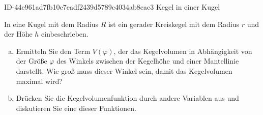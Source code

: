 \begin{exercise}
      {ID-44e961ad7fb10c7eadf2439d5789c4034ab8cac3}
      {Kegel in einer Kugel}
  \ifproblem\problem\par
    \ifthenelse{\isundefined{\linecalc}}{\newlength{\linecalc}}{\relax}%
    \setlength{\linecalc}{\linewidth}%
    \addtolength{\linecalc}{-68mm}%
    \begin{minipage}[T]{\linecalc}
      In eine Kugel mit dem Radius $R$ ist ein gerader Kreiskegel mit dem Radius $r$
      und der Höhe $h$ einbeschrieben.
      \begin{enumerate}[a)]
        \item Ermitteln Sie den Term $V(\varphi)$, der das Kegelvolumen in
              Abhängigkeit von der Größe $\varphi$ des Winkels zwischen
              der Kegelhöhe und einer Mantellinie darstellt.
              Wie groß muss dieser Winkel sein, damit das Kegelvolumen
              maximal wird?
        \item Drücken Sie die Kegelvolumenfunktion durch andere Variablen aus
              und diskutieren Sie eine dieser Funktionen.
      \end{enumerate}
    \end{minipage}\hfill
    \begin{minipage}[T]{61mm}
      \raggedleft
    \end{minipage}
  \fi
\end{exercise}
